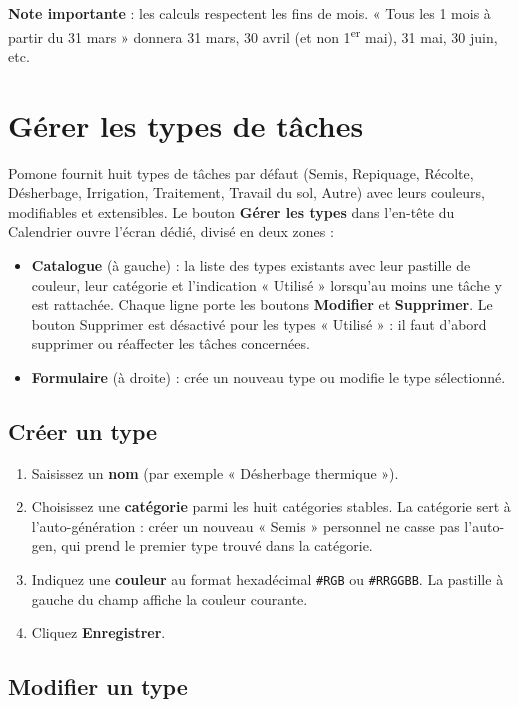 \textbf{Note importante} : les calculs respectent les fins de mois. « Tous les 1 mois à partir du 31 mars » donnera 31 mars, 30 avril (et non 1\textsuperscript{er} mai), 31 mai, 30 juin, etc.

\section{Gérer les types de tâches}

Pomone fournit huit types de tâches par défaut (Semis, Repiquage, Récolte, Désherbage, Irrigation, Traitement, Travail du sol, Autre) avec leurs couleurs, modifiables et extensibles. Le bouton \textbf{Gérer les types} dans l'en-tête du Calendrier ouvre l'écran dédié, divisé en deux zones :

\begin{itemize}
  \item \textbf{Catalogue} (à gauche) : la liste des types existants avec leur pastille de couleur, leur catégorie et l'indication « Utilisé » lorsqu'au moins une tâche y est rattachée. Chaque ligne porte les boutons \textbf{Modifier} et \textbf{Supprimer}. Le bouton Supprimer est désactivé pour les types « Utilisé » : il faut d'abord supprimer ou réaffecter les tâches concernées.
  \item \textbf{Formulaire} (à droite) : crée un nouveau type ou modifie le type sélectionné.
\end{itemize}

\subsection*{Créer un type}

\begin{enumerate}
  \item Saisissez un \textbf{nom} (par exemple « Désherbage thermique »).
  \item Choisissez une \textbf{catégorie} parmi les huit catégories stables. La catégorie sert à l'auto-génération : créer un nouveau « Semis » personnel ne casse pas l'auto-gen, qui prend le premier type trouvé dans la catégorie.
  \item Indiquez une \textbf{couleur} au format hexadécimal \texttt{\#RGB} ou \texttt{\#RRGGBB}. La pastille à gauche du champ affiche la couleur courante.
  \item Cliquez \textbf{Enregistrer}.
\end{enumerate}

\subsection*{Modifier un type}

